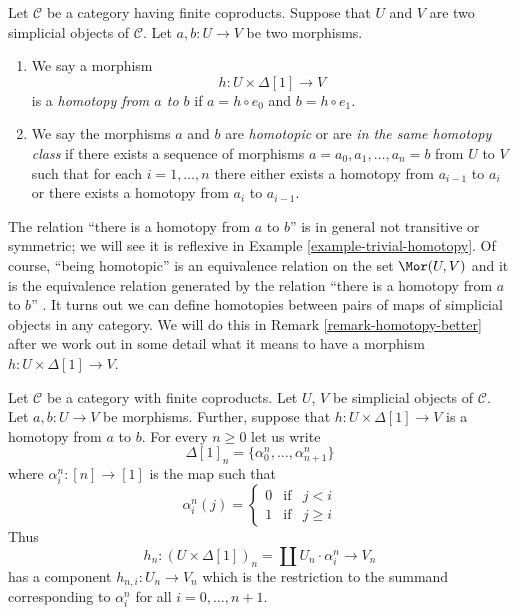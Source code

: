 \begin{definition}
\label{definition-homotopy}
Let $\mathcal{C}$ be a category having finite coproducts.
Suppose that $U$ and $V$ are two simplicial objects of $\mathcal{C}$.
Let $a, b : U \to V$ be two morphisms.
\begin{enumerate}
\item We say a morphism
$$
h : U \times \Delta[1] \longrightarrow V
$$
is a {\it homotopy from $a$ to $b$} if $a = h \circ e_0$ and
$b = h \circ e_1$.
\item We say the morphisms $a$ and $b$ are {\it homotopic} or are
{\it in the same homotopy class}
if there exists a sequence of morphisms $a = a_0, a_1, \ldots, a_n = b$
from $U$ to $V$ such that for each $i = 1, \ldots, n$ there either exists
a homotopy from $a_{i - 1}$ to $a_i$ or there exists a homotopy
from $a_i$ to $a_{i - 1}$.
\end{enumerate}
\end{definition}

\noindent
The relation ``there is a homotopy from $a$ to $b$'' is in general not
transitive or symmetric; we will see it is reflexive in
Example \ref{example-trivial-homotopy}. Of course, ``being homotopic''
is an equivalence relation on the set $\Mor(U, V)$ and it is the
equivalence relation generated by the relation
``there is a homotopy from $a$ to $b$'' .
It turns out we can define homotopies between pairs of maps of simplicial
objects in any category. We will do this in Remark \ref{remark-homotopy-better}
after we work out in some detail what it means to have a morphism
$h : U \times \Delta[1] \to V$.

\medskip\noindent
Let $\mathcal{C}$ be a category with finite coproducts.
Let $U$, $V$ be simplicial objects of $\mathcal{C}$.
Let $a, b : U \to V$ be morphisms. Further, suppose
that $h : U \times \Delta[1] \to V$ is a homotopy
from $a$ to $b$. For every $n \geq 0$
let us write
$$
\Delta[1]_n = \{\alpha^n_0, \ldots, \alpha^n_{n + 1}\}
$$
where $\alpha^n_i : [n] \to [1]$ is the map
such that
$$
\alpha^n_i(j)
=
\left\{
\begin{matrix}
0 & \text{if} & j < i\\
1 & \text{if} & j \geq i
\end{matrix}
\right.
$$
Thus
$$
h_n : (U \times \Delta[1])_n = \coprod U_n \cdot \alpha^n_i
\longrightarrow
V_n
$$
has a component $h_{n, i} : U_n \to V_n$ which is the restriction
to the summand corresponding to $\alpha^n_i$ for all $i = 0, \ldots, n + 1$.

